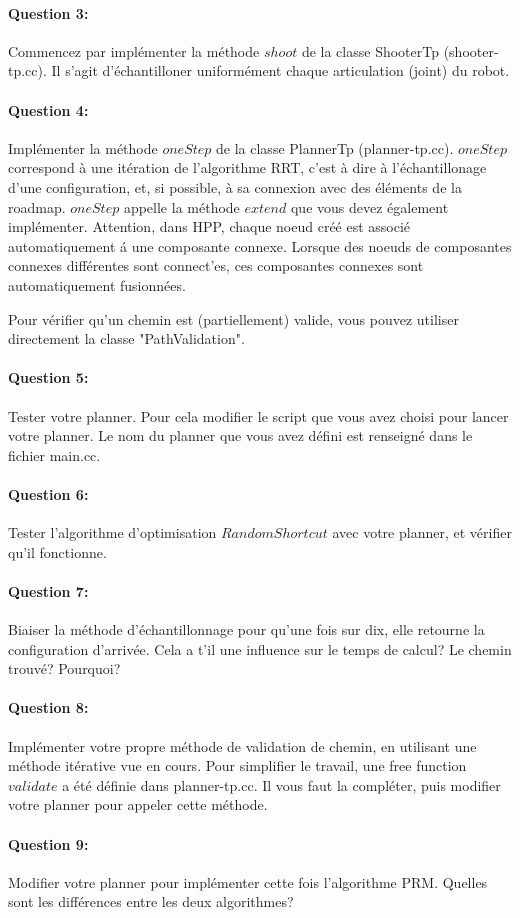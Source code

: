 \documentclass {article}
\begin{document}
\paragraph {Question 3:}
Commencez par impl\'ementer la m\'ethode $shoot$ de la classe ShooterTp (shooter-tp.cc).
Il s'agit d'\'echantilloner uniform\'ement chaque articulation (joint) du robot.

\paragraph {Question 4:}
Impl\'ementer la m\'ethode $oneStep$ de la classe PlannerTp (planner-tp.cc).
$oneStep$ correspond \`a une it\'eration de l'algorithme RRT, c'est \`a dire \`a l'\'echantillonage d'une configuration,
et, si possible, \`a sa connexion avec des \'el\'ements de la roadmap.
$oneStep$ appelle la m\'ethode $extend$ que vous devez \'egalement impl\'ementer.
Attention, dans HPP, chaque noeud cr\'e\'e est associ\'e automatiquement \'a une composante connexe.
Lorsque des noeuds de composantes connexes diff\'erentes sont connect'es, ces composantes connexes sont automatiquement
fusionn\'ees.

Pour v\'erifier qu'un chemin est (partiellement) valide, vous pouvez utiliser directement la classe
"PathValidation".

\paragraph {Question 5:}
Tester votre planner. Pour cela modifier le script que vous avez choisi pour lancer votre planner.
Le nom du planner que vous avez d\'efini est renseign\'e dans le fichier main.cc.

\paragraph {Question 6:}
Tester l'algorithme d'optimisation $RandomShortcut$ avec votre planner, et v\'erifier qu'il fonctionne.

\paragraph {Question 7:}
Biaiser la m\'ethode d'\'echantillonnage pour qu'une fois sur dix, elle retourne la configuration d'arriv\'ee.
Cela a t'il une influence sur le temps de calcul? Le chemin trouv\'e?
Pourquoi?

\paragraph{Question 8:}
Impl\'ementer votre propre m\'ethode de validation de chemin, en utilisant une m\'ethode it\'erative
vue en cours. Pour simplifier le travail, une free function $validate$ a été d\'efinie dans planner-tp.cc.
Il vous faut la compl\'eter, puis modifier votre planner pour appeler cette m\'ethode.

\paragraph{Question 9:}
Modifier votre planner pour impl\'ementer cette fois l'algorithme PRM.
Quelles sont les diff\'erences entre les deux algorithmes?
\end{document}
